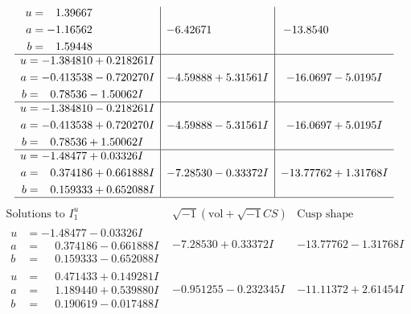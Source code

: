 \documentclass[1p]{elsarticle_modified}
\theoremstyle{definition}
\newcommand{\I}{\sqrt{-1}}
\begin{document}
$$\begin{array}{c|c|c}
\begin{aligned}
u &= \phantom{-}1.39667\phantom{ +0.000000I} \\
a &= -1.16562\phantom{ +0.000000I} \\
b &= \phantom{-}1.59448\phantom{ +0.000000I}\end{aligned}
 & -6.42671\phantom{ +0.000000I} & -13.8540\phantom{ +0.000000I} \\ \hline\begin{aligned}
u &= -1.384810 + 0.218261 I \\
a &= -0.413538 - 0.720270 I \\
b &= \phantom{-}0.78536 - 1.50062 I\end{aligned}
 & -4.59888 + 5.31561 I & -16.0697 - 5.0195 I \\ \hline\begin{aligned}
u &= -1.384810 - 0.218261 I \\
a &= -0.413538 + 0.720270 I \\
b &= \phantom{-}0.78536 + 1.50062 I\end{aligned}
 & -4.59888 - 5.31561 I & -16.0697 + 5.0195 I \\ \hline\begin{aligned}
u &= -1.48477 + 0.03326 I \\
a &= \phantom{-}0.374186 + 0.661888 I \\
b &= \phantom{-}0.159333 + 0.652088 I\end{aligned}
 & -7.28530 - 0.33372 I & -13.77762 + 1.31768 I\\
 \hline 
 \end{array}$$\newpage$$\begin{array}{c|c|c}  
\text{Solutions to }I^u_{1}& \I (\text{vol} + \sqrt{-1}CS) & \text{Cusp shape}\\
 \hline 
\begin{aligned}
u &= -1.48477 - 0.03326 I \\
a &= \phantom{-}0.374186 - 0.661888 I \\
b &= \phantom{-}0.159333 - 0.652088 I\end{aligned}
 & -7.28530 + 0.33372 I & -13.77762 - 1.31768 I \\ \hline\begin{aligned}
u &= \phantom{-}0.471433 + 0.149281 I \\
a &= \phantom{-}1.189440 + 0.539880 I \\
b &= \phantom{-}0.190619 - 0.017488 I\end{aligned}
 & -0.951255 - 0.232345 I & -11.11372 + 2.61454 I \\ \hline\begin{aligned}

\end{aligned}
\end{array}$$
\end{document}
